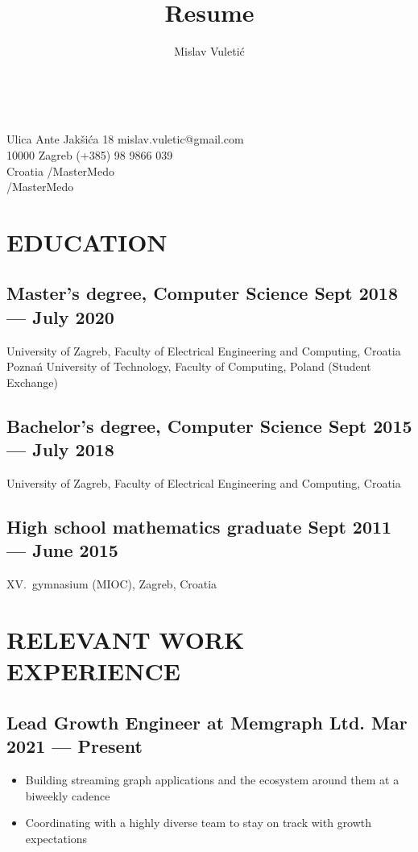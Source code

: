 \documentclass{article}
\begin{document}
\title{Resume}
\author{Mislav Vuletić}

\Huge\bfseries\theauthor\

\mdseries\large

Ulica Ante Jakšića 18 \hfill mislav.vuletic@gmail.com\\
10000 Zagreb                    \hfill {} (+385) 98 9866 039\\
Croatia                         \hfill {}/MasterMedo\\
\-                              \hfill {}/MasterMedo

\normalsize

\section{EDUCATION}
\subsection{Master's degree, Computer Science \hfill Sept 2018 --- July 2020}
University of Zagreb, Faculty of Electrical Engineering and Computing, Croatia\\
Poznań University of Technology, Faculty of Computing, Poland (Student Exchange)

\subsection{Bachelor's degree, Computer Science \hfill Sept 2015 --- July 2018}
University of Zagreb, Faculty of Electrical Engineering and Computing, Croatia

\subsection{High school mathematics graduate \hfill Sept 2011 --- June 2015}
XV.\ gymnasium (MIOC), Zagreb, Croatia

\section{RELEVANT WORK EXPERIENCE}
\subsection{Lead Growth Engineer at Memgraph Ltd. \hfill Mar 2021 --- Present}
\begin{itemize}
  \itemsep0em
  \item Building streaming graph applications and the ecosystem around them at a biweekly cadence
  \item Coordinating with a highly diverse team to stay on track with growth expectations
\end{itemize}
\end{document}

